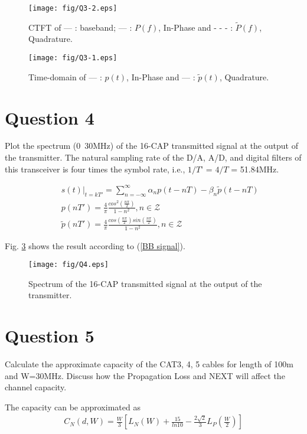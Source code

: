 \documentclass[journal]{IEEEtran}
\begin{document}
\begin{figure}[!tbp]
\center
\texttt{[image: fig/Q3-2.eps]}
\caption{CTFT of --- : baseband; {\color{blue} ---} : $P(f)$, In-Phase and {\color{red} - - -} : $\tilde{P}(f)$, Quadrature.}
\label{fig8}
\end{figure}

\begin{figure}[!tbp]
\center
\texttt{[image: fig/Q3-1.eps]}
\caption{Time-domain of --- : $p(t)$, In-Phase and {\color{blue} ---} : $\tilde{p}(t)$, Quadrature.}
\label{fig9}
\end{figure}

\section{Question 4}
Plot the spectrum (0~30MHz) of the 16-CAP transmitted signal at the output of the transmitter. 
The natural sampling rate of the D/A, A/D, and digital filters of this transceiver is four times the symbol rate, i.e., $1/T’$ = $4/T$ = 51.84MHz. 

\begin{eqnarray}
&& s(t)|_{t = kT'} = \displaystyle 
\sum_{n = - \infty}^\infty
\alpha_n p(t-nT) - \beta_n \tilde{p}(t-nT)
\nonumber \\
&& p(nT') = \displaystyle
\frac{4}{\pi} \frac{cos^2(\frac{n\pi}{2})}{1-n^2},
n \in \mathcal{Z}
\nonumber \\
&& \tilde{p}(nT') = \displaystyle
\frac{4}{\pi} 
\frac{cos(\frac{n\pi}{2})sin(\frac{n\pi}{2})}
{1-n^2}, n \in \mathcal{Z}
\label{BB signal}
\end{eqnarray}

Fig. \ref{fig10} shows the result according to (\ref{BB signal}).

\begin{figure}[!htbp]
\center
\texttt{[image: fig/Q4.eps]}
\caption{Spectrum of the 16-CAP transmitted signal at the output of the transmitter.}
\label{fig10}
\end{figure}

\section{Question 5}
Calculate the approximate capacity of 
the CAT3, 4, 5 cables for length of 100m and W=30MHz.
Discuss how the Propagation Loss and NEXT will affect the 
channel capacity. 

The capacity can be approximated as 
\begin{eqnarray}
C_N(d,W) = \frac{W}{3} \left[ L_N(W) + \frac{15}{ln 10} -
\frac{2\sqrt{2}}{3} L_P\left( \frac{W}{2} \right)\right]
\label{capacity} 
\end{eqnarray}
\end{document}

